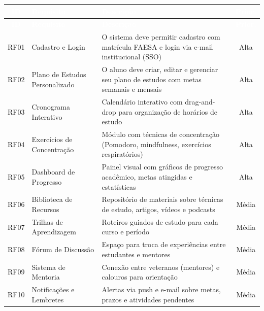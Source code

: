 \documentclass[12pt, a4paper]{article}
\begin{document}
\begin{longtable}{|c|p{4.5cm}|p{6.5cm}|c|}
\hline
\rowcolor{faesaAzul}
\textcolor{white}{\textbf{ID}} & \textcolor{white}{\textbf{Requisito}} & \textcolor{white}{\textbf{Descrição}} & \textcolor{white}{\textbf{Prior.}} \\
\hline
\endfirsthead

\hline
\rowcolor{faesaAzul}
\textcolor{white}{\textbf{ID}} & \textcolor{white}{\textbf{Requisito}} & \textcolor{white}{\textbf{Descrição}} & \textcolor{white}{\textbf{Prior.}} \\
\hline
\endhead

\rowcolor{reqFunc}
RF01 & Cadastro e Login & O sistema deve permitir cadastro com matrícula FAESA e login via e-mail institucional (SSO) & Alta \\
\hline

RF02 & Plano de Estudos Personalizado & O aluno deve criar, editar e gerenciar seu plano de estudos com metas semanais e mensais & Alta \\
\hline

\rowcolor{reqFunc}
RF03 & Cronograma Interativo & Calendário interativo com drag-and-drop para organização de horários de estudo & Alta \\
\hline

RF04 & Exercícios de Concentração & Módulo com técnicas de concentração (Pomodoro, mindfulness, exercícios respiratórios) & Alta \\
\hline

\rowcolor{reqFunc}
RF05 & Dashboard de Progresso & Painel visual com gráficos de progresso acadêmico, metas atingidas e estatísticas & Alta \\
\hline

RF06 & Biblioteca de Recursos & Repositório de materiais sobre técnicas de estudo, artigos, vídeos e podcasts & Média \\
\hline

\rowcolor{reqFunc}
RF07 & Trilhas de Aprendizagem & Roteiros guiados de estudo para cada curso e período & Média \\
\hline

RF08 & Fórum de Discussão & Espaço para troca de experiências entre estudantes e mentores & Média \\
\hline

\rowcolor{reqFunc}
RF09 & Sistema de Mentoria & Conexão entre veteranos (mentores) e calouros para orientação & Média \\
\hline

RF10 & Notificações e Lembretes & Alertas via push e e-mail sobre metas, prazos e atividades pendentes & Média \\
\hline


\end{longtable}
\end{document}
